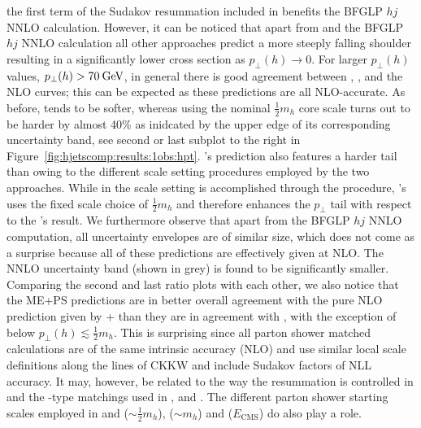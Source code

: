 the first term of the Sudakov resummation included in \Powheg benefits 
the BFGLP $hj$ NNLO calculation. However, it
can be noticed that apart from \Powheg and the BFGLP $hj$ NNLO
calculation all other approaches predict a more steeply falling
shoulder resulting in a significantly lower
cross section as $p_\perp(h)\to0$.
For larger $p_\perp(h)$ values, $p_\perp(h)>70\text{\:GeV}$, in general there
is good agreement between \Powheg, \MGaMC, \Sherpa and the NLO curves;
this can be expected as these predictions are all NLO-accurate. As
before, \Herwig tends to be softer, whereas \MGaMC using the nominal
$\tfrac{1}{2}m_h$ core scale turns out to be harder by almost 40\% as
inidcated by the upper edge of its corresponding uncertainty band, see
second or last subplot to the right in
Figure~\ref{fig:hjetscomp:results:1obs:hpt}. \Sherpa's \NNLOPS
prediction also features a harder tail than \Powheg owing to the
different scale setting procedures employed by the two approaches.
While in \Powheg the scale setting is accomplished through the \Minlo
procedure, \Sherpa's \NNLOPS uses the fixed scale choice of $\tfrac{1}{2}m_h$
and therefore enhances the $p_\perp$ tail with respect to the \Powheg's result. We
furthermore observe that apart from the BFGLP $hj$ NNLO computation, all
uncertainty envelopes are of similar size, which does not come as a
surprise because all of these predictions are effectively given at
NLO. The NNLO uncertainty band (shown in grey) is found to be
significantly smaller. Comparing the second and last ratio plots with
each other, we also notice that the ME+PS predictions are in better
overall agreement with the pure NLO prediction given by \GoSam{}+\Sherpa
than they are in agreement with \Powheg, with the exception of \MGaMC 
below $p_\perp(h)\lesssim \tfrac{1}{2}m_h$. This is surprising since all parton 
shower matched calculations are of the same intrinsic accuracy (NLO) and 
use similar local scale definitions along the lines of CKKW and include 
Sudakov factors of NLL accuracy. It may, however, be related to the way 
the resummation is controlled in \Powheg and the \MCatNLO-type matchings 
used in \MGaMC, \Herwig and \Sherpa. The different parton shower starting 
scales employed in \Herwig and \Sherpa ($\sim \tfrac{1}{2}m_h$), 
\MGaMC ($\sim m_h$) and \Powheg ($E_\text{CMS}$) do also play a role.

